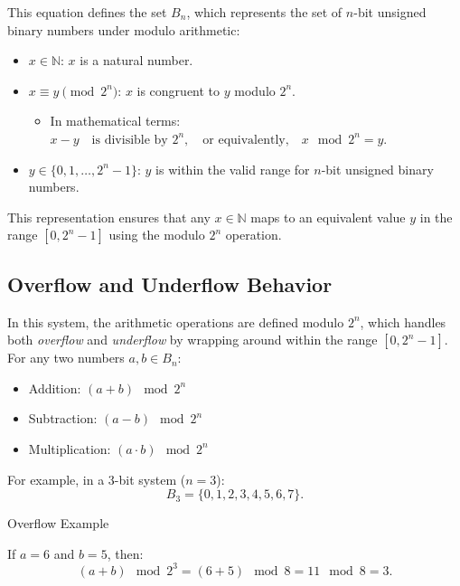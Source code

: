 This equation defines the set \( B_n \), which represents the set of \( n \)-bit unsigned binary numbers under modulo arithmetic:
\begin{itemize}
    \item \( x \in \mathbb{N} \): \( x \) is a natural number.
    \item \( x \equiv y \pmod{2^n} \): \( x \) is congruent to \( y \) modulo \( 2^n \).
    \begin{itemize}
        \item In mathematical terms:
        \(
            x - y \quad \text{is divisible by } 2^n, \quad \text{or equivalently,} \quad x \mod 2^n = y.
            \)
    \end{itemize}
    \item \( y \in \{0, 1, \dots, 2^n - 1\} \): \( y \) is within the valid range for \( n \)-bit unsigned binary numbers.
\end{itemize}

\vspace{\baselineskip}\par
This representation ensures that any \( x \in \mathbb{N} \) maps to an equivalent value \( y \) in the range \( [0, 2^n - 1] \) using the modulo \( 2^n \) operation.

\subsection{Overflow and Underflow Behavior}
In this system, the arithmetic operations are defined modulo \( 2^n \), which handles both \textit{overflow} and \textit{underflow} by wrapping around within the range \( [0, 2^n - 1] \). For any two numbers \( a, b \in B_n \):
\begin{itemize}
    \item Addition: \( (a + b) \mod 2^n \)
    \item Subtraction: \( (a - b) \mod 2^n \)
    \item Multiplication: \( (a \cdot b) \mod 2^n \)
\end{itemize}

\vspace{\baselineskip}\par
For example, in a 3-bit system (\( n = 3 \)):
\[
B_3 = \{0, 1, 2, 3, 4, 5, 6, 7\}.
\]

Overflow Example

If \( a = 6 \) and \( b = 5 \), then:
\[
(a + b) \mod 2^3 = (6 + 5) \mod 8 = 11 \mod 8 = 3.
\]


